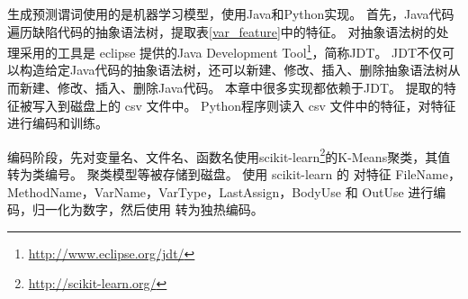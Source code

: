 生成预测谓词使用的是机器学习模型，使用Java和Python实现。
首先，Java代码遍历缺陷代码的抽象语法树，提取表\ref{var_feature}中的特征。
对抽象语法树的处理采用的工具是 eclipse 提供的Java Development Tool\footnote{\url{http://www.eclipse.org/jdt/}}，简称JDT。
JDT不仅可以构造给定Java代码的抽象语法树，还可以新建、修改、插入、删除抽象语法树从而新建、修改、插入、删除Java代码。
本章中很多实现都依赖于JDT。
提取的特征被写入到磁盘上的 csv 文件中。
Python程序则读入 csv 文件中的特征，对特征进行编码和训练。

编码阶段，先对变量名、文件名、函数名使用scikit-learn\footnote{\url{http://scikit-learn.org/}}的K-Means聚类，其值转为类编号。
聚类模型等被存储到磁盘。
使用 scikit-learn 的  对特征 FileName，MethodName，VarName，VarType，LastAssign，BodyUse
和 OutUse 进行编码，归一化为数字，然后使用  转为独热编码。

